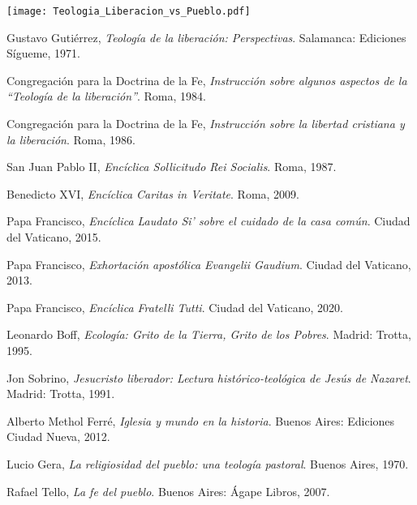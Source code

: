 \documentclass[12pt]{article}
\begin{document}
\texttt{[image:  Teologia\_Liberacion\_vs\_Pueblo.pdf]}

\begin{thebibliography}{99}

Gustavo Gutiérrez, 
\textit{Teología de la liberación: Perspectivas}. 
Salamanca: Ediciones Sígueme, 1971.

Congregación para la Doctrina de la Fe, 
\textit{Instrucción sobre algunos aspectos de la “Teología de la liberación”}. 
Roma, 1984.

Congregación para la Doctrina de la Fe, 
\textit{Instrucción sobre la libertad cristiana y la liberación}. 
Roma, 1986.

San Juan Pablo II, 
\textit{Encíclica Sollicitudo Rei Socialis}. 
Roma, 1987.

Benedicto XVI, 
\textit{Encíclica Caritas in Veritate}. 
Roma, 2009.

Papa Francisco, 
\textit{Encíclica Laudato Si’ sobre el cuidado de la casa común}. 
Ciudad del Vaticano, 2015.

Papa Francisco, 
\textit{Exhortación apostólica Evangelii Gaudium}. 
Ciudad del Vaticano, 2013.

Papa Francisco, 
\textit{Encíclica Fratelli Tutti}. 
Ciudad del Vaticano, 2020.

Leonardo Boff, 
\textit{Ecología: Grito de la Tierra, Grito de los Pobres}. 
Madrid: Trotta, 1995.

Jon Sobrino, 
\textit{Jesucristo liberador: Lectura histórico-teológica de Jesús de Nazaret}. 
Madrid: Trotta, 1991.

Alberto Methol Ferré, 
\textit{Iglesia y mundo en la historia}. 
Buenos Aires: Ediciones Ciudad Nueva, 2012.

Lucio Gera, 
\textit{La religiosidad del pueblo: una teología pastoral}. 
Buenos Aires, 1970.

Rafael Tello, 
\textit{La fe del pueblo}. 
Buenos Aires: Ágape Libros, 2007.

\end{thebibliography}
\end{document}
